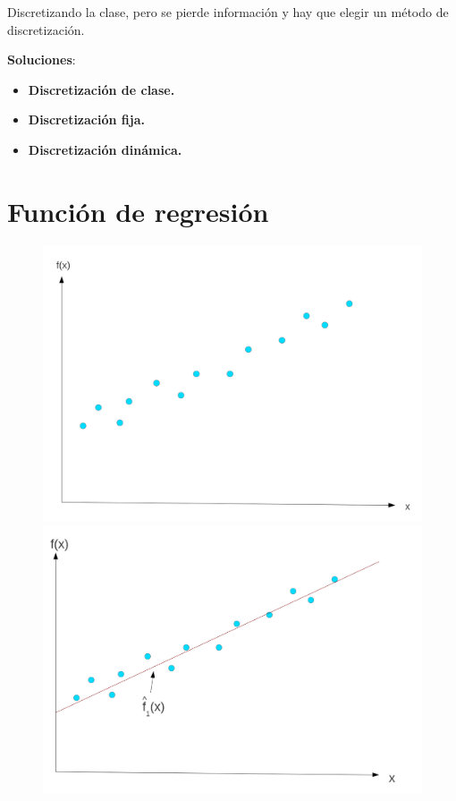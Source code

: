 \documentclass[12pt, twoside, openright]{report} %
\begin{document}
Discretizando la clase, pero se pierde información y hay que elegir un
método de discretización.

\textbf{Soluciones}:

\begin{itemize}
	\item \textbf{Discretización de clase.}
	\item \textbf{Discretización fija.}
	\item \textbf{Discretización dinámica.}
\end{itemize}

\section{Función de regresión}
\begin{figure}[H]
	{\includegraphics[scale=.15]{image-20210305211354068.png}
		\includegraphics[scale=.15]{image-20210305211454026.png}}
\end{figure}
\end{document}
